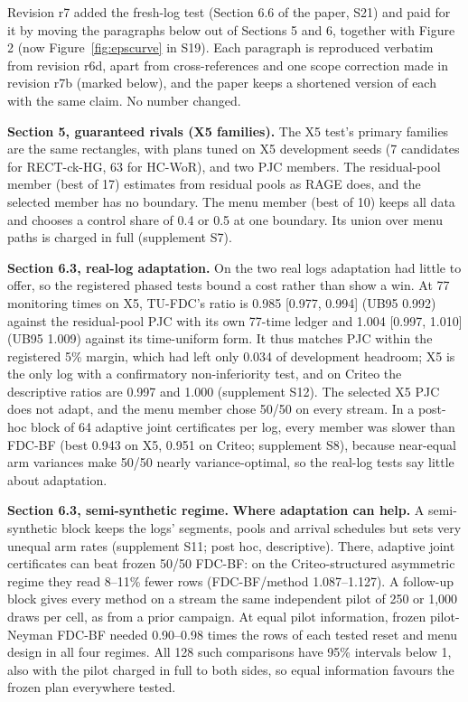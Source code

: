 \documentclass[sigconf,anonymous,review]{acmart}
\begin{document}
Revision r7 added the fresh-log test (Section 6.6 of the paper, S21) and paid for it by moving the paragraphs below out of Sections 5 and 6, together with Figure 2 (now Figure~\ref{fig:epscurve} in S19). Each paragraph is reproduced verbatim from revision r6d, apart from cross-references and one scope correction made in revision r7b (marked below), and the paper keeps a shortened version of each with the same claim. No number changed.

\textbf{Section 5, guaranteed rivals (X5 families).} The X5 test's primary families are the same rectangles, with plans tuned on X5 development seeds (7 candidates for RECT-ck-HG, 63 for HC-WoR), and two PJC members. The residual-pool member (best of 17) estimates from residual pools as RAGE does, and the selected member has no boundary. The menu member (best of 10) keeps all data and chooses a control share of 0.4 or 0.5 at one boundary. Its union over menu paths is charged in full (supplement S7).

\textbf{Section 6.3, real-log adaptation.} On the two real logs adaptation had little to offer, so the registered phased tests bound a cost rather than show a win. At 77 monitoring times on X5, TU-FDC's ratio is 0.985 [0.977, 0.994] (UB95 0.992) against the residual-pool PJC with its own 77-time ledger and 1.004 [0.997, 1.010] (UB95 1.009) against its time-uniform form. It thus matches PJC within the registered 5\% margin, which had left only 0.034 of development headroom; X5 is the only log with a confirmatory non-inferiority test, and on Criteo the descriptive ratios are 0.997 and 1.000 (supplement S12). The selected X5 PJC does not adapt, and the menu member chose 50/50 on every stream. In a post-hoc block of 64 adaptive joint certificates per log, every member was slower than FDC-BF (best 0.943 on X5, 0.951 on Criteo; supplement S8), because near-equal arm variances make 50/50 nearly variance-optimal, so the real-log tests say little about adaptation.

\textbf{Section 6.3, semi-synthetic regime.} \textbf{Where adaptation can help.} A semi-synthetic block keeps the logs' segments, pools and arrival schedules but sets very unequal arm rates (supplement S11; post hoc, descriptive). There, adaptive joint certificates can beat frozen 50/50 FDC-BF: on the Criteo-structured asymmetric regime they read 8--11\% fewer rows (FDC-BF/method 1.087--1.127). A follow-up block gives every method on a stream the same independent pilot of 250 or 1,000 draws per cell, as from a prior campaign. At equal pilot information, frozen pilot-Neyman FDC-BF needed 0.90--0.98 times the rows of each tested reset and menu design in all four regimes. All 128 such comparisons have 95\% intervals below 1, also with the pilot charged in full to both sides, so equal information favours the frozen plan everywhere tested.
\end{document}
